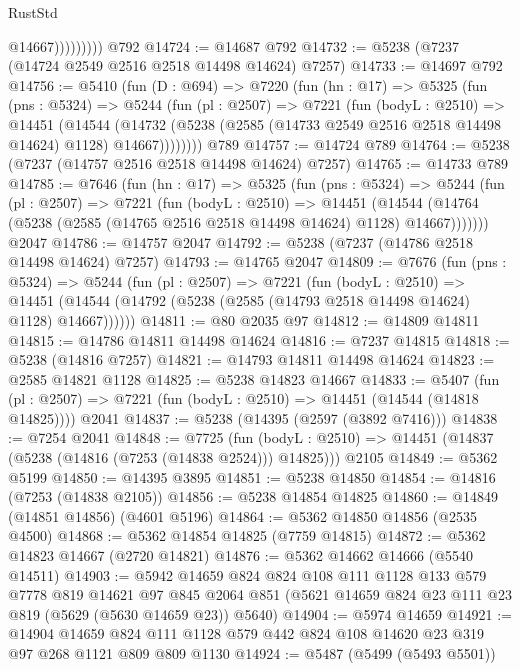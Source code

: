 \begin{lexlean}{RustStd}
\begin{coremodule}
                      @14667)))))))))
    @792
@14724 := @14687 @792
@14732 := @5238 (@7237 (@14724 @2549 @2516 @2518 @14498 @14624) @7257)
@14733 := @14697 @792
@14756 := @5410
    (fun (D : @694) =>
    @7220
      (fun (hn : @17) =>
      @5325
        (fun (pns : @5324) =>
        @5244
          (fun (pl : @2507) =>
          @7221
            (fun (bodyL : @2510) =>
            @14451
              (@14544
                (@14732 (@5238 (@2585 (@14733 @2549 @2516 @2518 @14498 @14624) @1128) @14667))))))))
    @789
@14757 := @14724 @789
@14764 := @5238 (@7237 (@14757 @2516 @2518 @14498 @14624) @7257)
@14765 := @14733 @789
@14785 := @7646
    (fun (hn : @17) =>
    @5325
      (fun (pns : @5324) =>
      @5244
        (fun (pl : @2507) =>
        @7221
          (fun (bodyL : @2510) =>
          @14451
            (@14544 (@14764 (@5238 (@2585 (@14765 @2516 @2518 @14498 @14624) @1128) @14667)))))))
    @2047
@14786 := @14757 @2047
@14792 := @5238 (@7237 (@14786 @2518 @14498 @14624) @7257)
@14793 := @14765 @2047
@14809 := @7676
    (fun (pns : @5324) =>
    @5244
      (fun (pl : @2507) =>
      @7221
        (fun (bodyL : @2510) =>
        @14451 (@14544 (@14792 (@5238 (@2585 (@14793 @2518 @14498 @14624) @1128) @14667))))))
@14811 := @80 @2035 @97
@14812 := @14809 @14811
@14815 := @14786 @14811 @14498 @14624
@14816 := @7237 @14815
@14818 := @5238 (@14816 @7257)
@14821 := @14793 @14811 @14498 @14624
@14823 := @2585 @14821 @1128
@14825 := @5238 @14823 @14667
@14833 := @5407
    (fun (pl : @2507) => @7221 (fun (bodyL : @2510) => @14451 (@14544 (@14818 @14825))))
    @2041
@14837 := @5238 (@14395 (@2597 (@3892 @7416)))
@14838 := @7254 @2041
@14848 := @7725
    (fun (bodyL : @2510) => @14451 (@14837 (@5238 (@14816 (@7253 (@14838 @2524))) @14825)))
    @2105
@14849 := @5362 @5199
@14850 := @14395 @3895
@14851 := @5238 @14850
@14854 := @14816 (@7253 (@14838 @2105))
@14856 := @5238 @14854 @14825
@14860 := @14849 (@14851 @14856) (@4601 @5196)
@14864 := @5362 @14850 @14856 (@2535 @4500)
@14868 := @5362 @14854 @14825 (@7759 @14815)
@14872 := @5362 @14823 @14667 (@2720 @14821)
@14876 := @5362 @14662 @14666 (@5540 @14511)
@14903 := @5942
    @14659
    @824
    @824
    @108
    @111
    @1128
    @133
    @579
    @7778
    @819
    @14621
    @97
    @845
    @2064
    @851
    (@5621 @14659 @824 @23 @111 @23 @819 (@5629 (@5630 @14659 @23)) @5640)
@14904 := @5974 @14659
@14921 := @14904
    @14659
    @824
    @111
    @1128
    @579
    @442
    @824
    @108
    @14620
    @23
    @319
    @97
    @268
    @1121
    @809
    @809
    @1130
@14924 := @5487 (@5499 (@5493 @5501))

\end{coremodule}
\end{lexlean}
